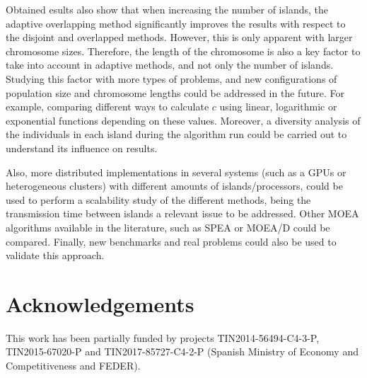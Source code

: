 \documentclass[preprint]{elsarticle}
\begin{document}
Obtained esults also show that when increasing the number of islands, the
adaptive overlapping method significantly improves the results with
respect to the disjoint and overlapped methods. However, this is only
apparent with larger chromosome sizes. Therefore, the length of the
chromosome is also a key factor to take into account in adaptive
methods, and not only the number of islands. Studying this factor with
more types of problems, and new configurations of population size and
chromosome lengths could be addressed in the future. For example, comparing 
different ways to calculate $c$ using linear, logarithmic or exponential functions
depending on these values. Moreover, a diversity analysis of the individuals
in each island during the algorithm run could be carried out to understand its influence
on results.
% 

Also, more distributed implementations in several systems (such as a
GPUs or heterogeneous clusters) with different amounts of
islands/processors, could be used to perform a scalability study of the
different methods, being the transmission time between islands a
relevant issue to be addressed. Other MOEA algorithms available in the literature, such as SPEA or MOEA/D could be compared. Finally, new benchmarks and real problems
could also be  used to validate this approach.  



\section*{Acknowledgements}
This work has been partially funded by projects TIN2014-56494-C4-3-P, TIN2015-67020-P and TIN2017-85727-C4-2-P (Spanish Ministry of Economy and Competitiveness and FEDER).






\end{document}
